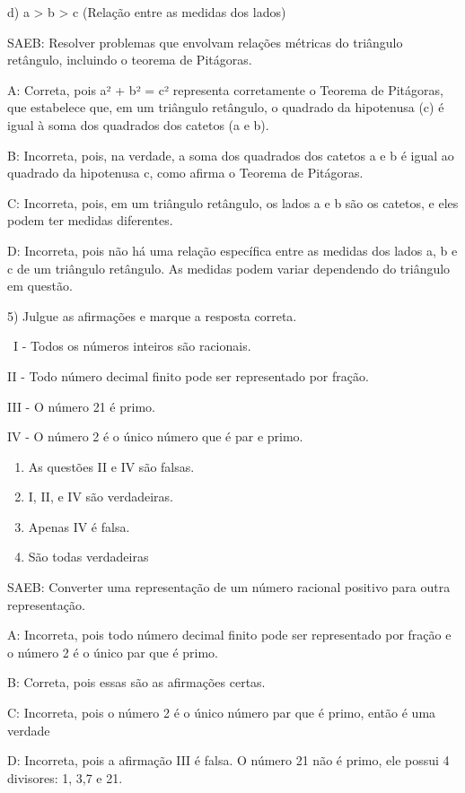 d) a \textgreater{} b \textgreater{} c (Relação entre as medidas dos
lados)

SAEB: Resolver problemas que envolvam relações métricas do triângulo
retângulo, incluindo o teorema de Pitágoras.

A: Correta, pois a² + b² = c² representa corretamente o Teorema de
Pitágoras, que estabelece que, em um triângulo retângulo, o quadrado da
hipotenusa (c) é igual à soma dos quadrados dos catetos (a e b).

B: Incorreta, pois, na verdade, a soma dos quadrados dos catetos a e b é
igual ao quadrado da hipotenusa c, como afirma o Teorema de Pitágoras.

C: Incorreta, pois, em um triângulo retângulo, os lados a e b são os
catetos, e eles podem ter medidas diferentes.

D: Incorreta, pois não há uma relação específica entre as medidas dos
lados a, b e c de um triângulo retângulo. As medidas podem variar
dependendo do triângulo em questão.

5) Julgue as afirmações e marque a resposta correta.

~I - Todos os números inteiros são racionais.

II - Todo número decimal finito pode ser representado por fração.

III - O número 21 é primo.

IV - O número 2 é o único número que é par e primo.

\begin{enumerate}
\def\labelenumi{\alph{enumi})}
\item
  As questões II e IV são falsas.
\item
  I, II, e IV são verdadeiras.
\item
  Apenas IV é falsa.
\item
  São todas verdadeiras
\end{enumerate}

SAEB: Converter uma representação de um número racional positivo para
outra representação.

A: Incorreta, pois todo número decimal finito pode ser representado por
fração e o número 2 é o único par que é primo.

B: Correta, pois essas são as afirmações certas.

C: Incorreta, pois o número 2 é o único número par que é primo, então é
uma verdade

D: Incorreta, pois a afirmação III é falsa. O número 21 não é primo, ele
possui 4 divisores: 1, 3,7 e 21.

